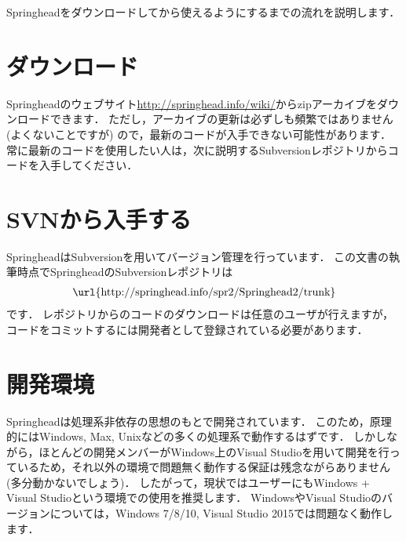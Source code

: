 Springhead\KLUDGE をダウンロードしてから使えるようにするまでの流れを説明します．

\section{\KLUDGE ダウンロード}

Springhead\KLUDGE のウェブサイト\url{http://springhead.info/wiki/}\KLUDGE からzip\KLUDGE アーカイブをダウンロードできます．
\KLUDGE ただし，アーカイブの更新は必ずしも頻繁ではありません (\KLUDGE よくないことですが) \KLUDGE ので，最新のコードが入手できない可能性があります．
\KLUDGE 常に最新のコードを使用したい人は，次に説明するSubversion\KLUDGE レポジトリからコードを入手してください．

\section{SVN\KLUDGE から入手する}

Springhead\KLUDGE はSubversion\KLUDGE を用いてバージョン管理を行っています．
\KLUDGE この文書の執筆時点でSpringhead\KLUDGE のSubversion\KLUDGE レポジトリは
\begin{align*}
\text{\url{http://springhead.info/spr2/Springhead2/trunk}}
\end{align*}
\KLUDGE です．
\KLUDGE レポジトリからのコードのダウンロードは任意のユーザが行えますが，
\KLUDGE コードをコミットするには開発者として登録されている必要があります．


\section{\KLUDGE 開発環境}

Springhead\KLUDGE は処理系非依存の思想のもとで開発されています．
\KLUDGE このため，原理的にはWindows, Max, Unix\KLUDGE などの多くの処理系で動作するはずです．
\KLUDGE しかしながら，ほとんどの開発メンバーがWindows\KLUDGE 上のVisual Studio\KLUDGE を用いて開発を行っているため，それ以外の環境で問題無く動作する保証は残念ながらありません (\KLUDGE 多分動かないでしょう)\KLUDGE ．
\KLUDGE したがって，現状ではユーザーにもWindows + Visual Studio\KLUDGE という環境での使用を推奨します．
Windows\KLUDGE やVisual Studio\KLUDGE のバージョンについては，Windows 7/8/10, Visual Studio 2015\KLUDGE では問題なく動作します．

